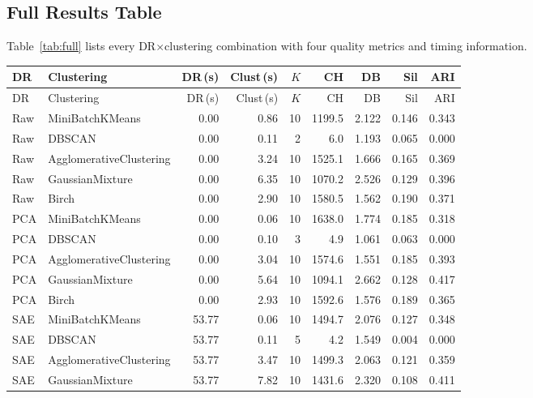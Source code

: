 \subsection{Full Results Table}

Table~\ref{tab:full} lists every DR$\times$clustering combination with four quality metrics
and timing information.

\begin{longtable}{llrrrrrrr}
\toprule
DR & Clustering & DR\,(s) & Clust\,(s) & $K$ & CH & DB & Sil & ARI \\
\midrule
\endfirsthead
\toprule
DR & Clustering & DR\,(s) & Clust\,(s) & $K$ & CH & DB & Sil & ARI \\
\midrule
\endhead
\bottomrule
\endfoot
Raw       & MiniBatchKMeans         &    0.00 &  0.86 & 10 & 1199.5  & 2.122 & 0.146 & 0.343 \\
Raw       & DBSCAN                  &    0.00 &  0.11 &  2 &    6.0  & 1.193 & 0.065 & 0.000 \\
Raw       & AgglomerativeClustering &    0.00 &  3.24 & 10 & 1525.1  & 1.666 & 0.165 & 0.369 \\
Raw       & GaussianMixture         &    0.00 &  6.35 & 10 & 1070.2  & 2.526 & 0.129 & 0.396 \\
Raw       & Birch                   &    0.00 &  2.90 & 10 & 1580.5  & 1.562 & 0.190 & 0.371 \\
\midrule
PCA       & MiniBatchKMeans         &    0.00 &  0.06 & 10 & 1638.0  & 1.774 & 0.185 & 0.318 \\
PCA       & DBSCAN                  &    0.00 &  0.10 &  3 &    4.9  & 1.061 & 0.063 & 0.000 \\
PCA       & AgglomerativeClustering &    0.00 &  3.04 & 10 & 1574.6  & 1.551 & 0.185 & 0.393 \\
PCA       & GaussianMixture         &    0.00 &  5.64 & 10 & 1094.1  & 2.662 & 0.128 & 0.417 \\
PCA       & Birch                   &    0.00 &  2.93 & 10 & 1592.6  & 1.576 & 0.189 & 0.365 \\
\midrule
SAE       & MiniBatchKMeans         &   53.77 &  0.06 & 10 & 1494.7  & 2.076 & 0.127 & 0.348 \\
SAE       & DBSCAN                  &   53.77 &  0.11 &  5 &    4.2  & 1.549 & 0.004 & 0.000 \\
SAE       & AgglomerativeClustering &   53.77 &  3.47 & 10 & 1499.3  & 2.063 & 0.121 & 0.359 \\
SAE       & GaussianMixture         &   53.77 &  7.82 & 10 & 1431.6  & 2.320 & 0.108 & 0.411 \\

\end{longtable}
